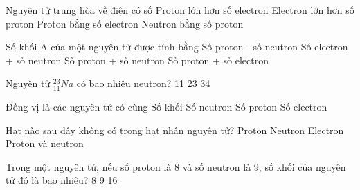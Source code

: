 \begin{ex}%
	Nguyên tử trung hòa về điện có số
	\choice
	{Proton lớn hơn số electron}
	{Electron lớn hơn số proton}
	{\True Proton bằng số electron}
	{Neutron bằng số proton}
\end{ex}

\begin{ex}%
	Số khối A của một nguyên tử được tính bằng
	\choice
	{Số proton - số neutron}
	{Số electron + số neutron}
	{\True Số proton + số neutron}
	{Số proton + số electron}
\end{ex}

\begin{ex}%
	Nguyên tử ${^{23}_{11}Na}$ có bao nhiêu neutron?
	\choice
	{11}
	{}
	{23}
	{34}
\end{ex}

\begin{ex}%
	Đồng vị là các nguyên tử có cùng
	\choice
	{Số khối}
	{Số neutron}
	{\True Số proton}
	{Số electron}
\end{ex}

\begin{ex}%
	Hạt nào sau đây không có trong hạt nhân nguyên tử?
	\choice
	{Proton}
	{Neutron}
	{\True Electron}
	{Proton và neutron}
\end{ex}

\begin{ex}%
	Trong một nguyên tử, nếu số proton là 8 và số neutron là 9, số khối của nguyên tử đó là bao nhiêu?
	\choice
	{8}
	{9}
	{16}
	{}
\end{ex}

